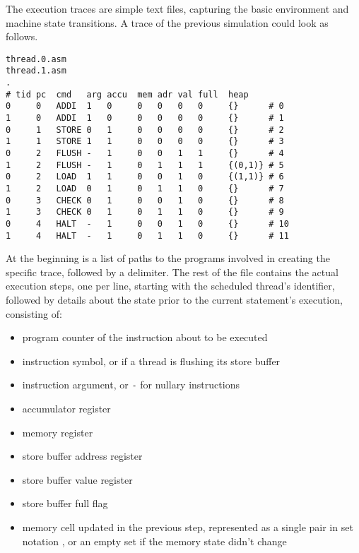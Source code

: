 The execution traces are simple text files, capturing the basic environment and machine state transitions.
A trace of the previous simulation could look as follows.

\begin{lstlisting}[style=asm, caption={Simple Output Trace}, label={lst:trace:simple}, xleftmargin=\parindent]
thread.0.asm
thread.1.asm
.
# tid pc  cmd   arg accu  mem adr val full  heap
0     0   ADDI  1   0     0   0   0   0     {}      # 0
1     0   ADDI  1   0     0   0   0   0     {}      # 1
0     1   STORE 0   1     0   0   0   0     {}      # 2
1     1   STORE 1   1     0   0   0   0     {}      # 3
0     2   FLUSH -   1     0   0   1   1     {}      # 4
1     2   FLUSH -   1     0   1   1   1     {(0,1)} # 5
0     2   LOAD  1   1     0   0   1   0     {(1,1)} # 6
1     2   LOAD  0   1     0   1   1   0     {}      # 7
0     3   CHECK 0   1     0   0   1   0     {}      # 8
1     3   CHECK 0   1     0   1   1   0     {}      # 9
0     4   HALT  -   1     0   0   1   0     {}      # 10
1     4   HALT  -   1     0   1   1   0     {}      # 11
\end{lstlisting}

At the beginning is a list of paths to the programs involved in creating the specific trace, followed by a delimiter.
The rest of the file contains the actual execution steps, one per line, starting with the scheduled thread's identifier, followed by details about the state prior to the current statement's execution, consisting of:

\begin{itemize}
  \item program counter of the instruction about to be executed
  \item instruction symbol, or  if a thread is flushing its store buffer
  \item instruction argument, or \texttt{-} for nullary instructions
  \item accumulator register
  \item {} memory register
  \item store buffer address register
  \item store buffer value register
  \item store buffer full flag
  \item memory cell updated in the previous step, represented as a single pair in set notation \texttt{}, or an empty set \texttt{\string{\string}} if the memory state didn't change
\end{itemize}

